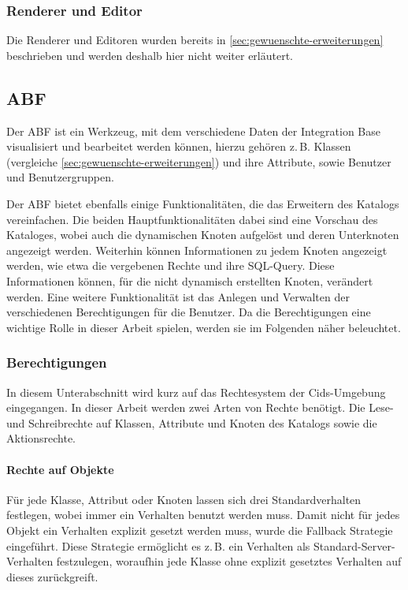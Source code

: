 \subsubsection{Renderer und Editor}
Die Renderer und Editoren wurden bereits in \autoref{sec:gewuenschte-erweiterungen} beschrieben und werden deshalb hier nicht weiter erläutert.

\subsection{ABF}
Der \ac{ABF} ist ein Werkzeug, mit dem verschiedene Daten der Integration Base visualisiert und bearbeitet werden können, hierzu gehören z.\,B. Klassen (vergleiche \autoref{sec:gewuenschte-erweiterungen}) und ihre Attribute, sowie Benutzer und Benutzergruppen.

Der \ac{ABF} bietet ebenfalls einige Funktionalitäten, die das Erweitern des Katalogs vereinfachen.
Die beiden Hauptfunktionalitäten dabei sind eine Vorschau des Kataloges, wobei auch die dynamischen Knoten aufgelöst und deren Unterknoten angezeigt werden.
Weiterhin können Informationen zu jedem Knoten angezeigt werden, wie etwa die vergebenen Rechte und ihre SQL-Query.
Diese Informationen können, für die nicht dynamisch erstellten Knoten, verändert werden.
Eine weitere Funktionalität ist das Anlegen und Verwalten der verschiedenen Berechtigungen für die Benutzer.
Da die Berechtigungen eine wichtige Rolle in dieser Arbeit spielen, werden sie im Folgenden näher beleuchtet. 

\subsubsection{Berechtigungen}
In diesem Unterabschnitt wird kurz auf das Rechtesystem der Cids-Umgebung eingegangen. In dieser Arbeit werden zwei Arten von Rechte benötigt. Die Lese- und Schreibrechte auf Klassen, Attribute und Knoten des Katalogs sowie die Aktionsrechte.

\paragraph{Rechte auf Objekte}
Für jede Klasse, Attribut oder Knoten lassen sich drei Standardverhalten festlegen, wobei immer ein Verhalten benutzt werden muss.
Damit nicht für jedes Objekt ein Verhalten explizit gesetzt werden muss, wurde die Fallback Strategie eingeführt.
Diese Strategie ermöglicht es z.\,B. ein Verhalten als Standard-Server-Verhalten festzulegen, woraufhin jede Klasse ohne explizit gesetztes Verhalten auf dieses zurückgreift.

